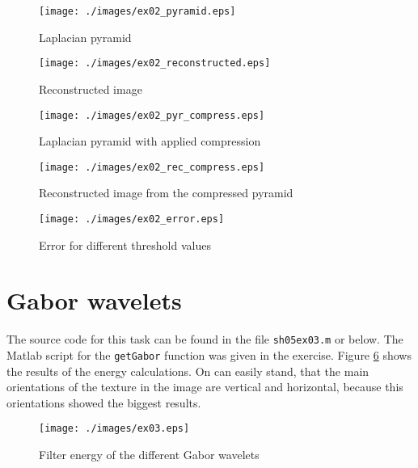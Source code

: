 \documentclass{article}
\begin{document}
\begin{figure}[H]
  \begin{center}
    \texttt{[image: ./images/ex02\_pyramid.eps]}
    \caption{Laplacian pyramid}
    \label{ex02_pyr}
  \end{center}
\end{figure}

\begin{figure}[H]
  \begin{center}
    \texttt{[image: ./images/ex02\_reconstructed.eps]}
    \caption{Reconstructed image}
    \label{ex02_rec}
  \end{center}
\end{figure}

\begin{figure}[H]
  \begin{center}
    \texttt{[image: ./images/ex02\_pyr\_compress.eps]}
    \caption{Laplacian pyramid with applied compression}
    \label{ex02_pyr_comp}
  \end{center}
\end{figure}

\begin{figure}[H]
  \begin{center}
    \texttt{[image: ./images/ex02\_rec\_compress.eps]}
    \caption{Reconstructed image from the compressed pyramid}
    \label{ex02_rec_comp}
  \end{center}
\end{figure}

\begin{figure}[H]
  \begin{center}
    \texttt{[image: ./images/ex02\_error.eps]}
    \caption{Error for different threshold values}
    \label{ex02_error}
  \end{center}
\end{figure}

\hspace{20mm}


\hspace{20mm}


\clearpage
\section{Gabor wavelets}
The source code for this task can be found in the file \texttt{sh05ex03.m} or below. The Matlab script for the \texttt{getGabor} function was given in the exercise. 
Figure \ref{ex03} shows the results of the energy calculations. On can easily stand, that the main orientations of the texture in the image are vertical and horizontal, because this orientations showed the biggest results.
\begin{figure}[H]
  \begin{center}
    \texttt{[image: ./images/ex03.eps]}
    \caption{Filter energy of the different Gabor wavelets}
    \label{ex03}
  \end{center}
\end{figure}

\hspace{20mm}

\end{document}
